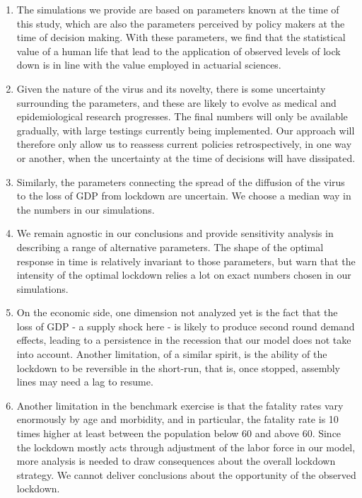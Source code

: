 \documentclass{amsart}
\begin{document}
\begin{enumerate}
\item The simulations we provide are based on parameters known at the time of this study, which are also the parameters perceived by policy makers at the time of decision making. With these parameters, we find that the statistical value of a human life 
that lead to the application of observed levels of 
lock down is in line with the value employed in 
actuarial sciences.


\item Given the nature of the virus and its novelty, there is some uncertainty surrounding the parameters, and these are likely to evolve as medical and epidemiological  research progresses. The final numbers will only be available gradually, with large testings currently being implemented. Our approach will therefore only 
allow us to reassess current policies retrospectively, in one way or another,  when the uncertainty at the time of decisions will have dissipated. 

\item Similarly, the parameters connecting the  spread of the diffusion of the virus to the loss of GDP from lockdown are uncertain. We choose a median way in the numbers in our simulations. 

\item We remain agnostic in our conclusions and provide sensitivity analysis in describing a range of alternative parameters. The shape of the optimal response in time is relatively invariant to those parameters, but warn that the intensity of the optimal lockdown relies a lot on exact numbers chosen in our simulations. 

\item On the economic side, one dimension not analyzed yet is the fact that the loss of GDP - a supply shock here - is likely to produce second round demand effects, leading to a persistence in the recession that our model does not take into account. Another limitation, of a similar spirit, is the ability of the lockdown to be reversible in the short-run, that is, once stopped, assembly lines may need a lag to resume.

\item Another limitation in the benchmark exercise is that the fatality rates vary enormously by age and morbidity, and in particular, the fatality rate is 10 times higher at least between the population below 60 and above 60. Since the lockdown mostly acts through adjustment of the labor force in our model, more analysis is needed to draw consequences about the overall lockdown strategy. We cannot deliver conclusions about the opportunity of the observed lockdown.  


\end{enumerate}
\end{document}
